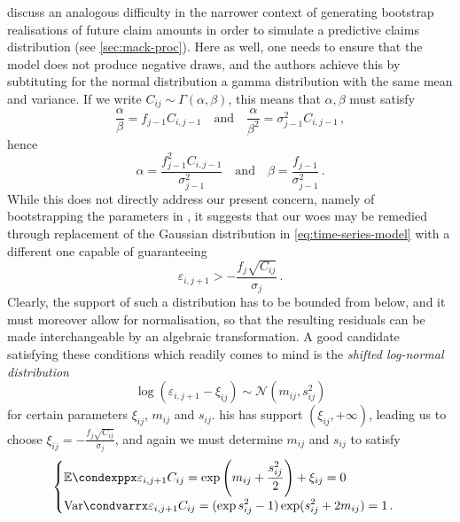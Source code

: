 \documentclass[a4paper]{book}
\begin{document}
\Textcite[238]{england:dist} discuss an analogous difficulty in the narrower context of generating bootstrap realisations of future claim amounts in order to simulate a predictive claims distribution (see \cref{sec:mack-proc}). Here as well, one needs to ensure that the model does not produce negative draws, and the authors achieve this by subtituting for the normal distribution a gamma distribution with the same mean and variance. If we write $C_{ij} \sim \Gamma(\alpha, \beta)$, this means that $\alpha, \beta$ must satisfy
\begin{equation}
  \frac{\alpha}{\beta} = f_{j-1} C_{i, j-1} \quad \text{and} \quad \frac{\alpha}{\beta^2} = \sigma^2_{j-1} C_{i, j-1} \,,
\end{equation}
hence
\begin{equation} \label{eq:gamma-sim}
  \alpha = \frac{f_{j-1}^2 C_{i, j-1}}{\sigma_{j-1}^2} \quad \text{and} \quad \beta = \frac{f_{j-1}}{\sigma_{j-1}^2} \,.
\end{equation}
While this does not directly address our present concern, namely of bootstrapping the parameters in , it suggests that our woes may be remedied through replacement of the Gaussian distribution in \cref{eq:time-series-model} with a different one capable of guaranteeing
\begin{equation} \label{eq:lower-limit-err}
  \varepsilon_{i, j + 1} > -\frac{f_j \sqrt{C_{ij}}}{\sigma_j} \,.
\end{equation}
Clearly, the support of such a distribution has to be bounded from below, and it must moreover allow for normalisation, so that the resulting residuals can be made interchangeable by an algebraic transformation. A good candidate satisfying these conditions which readily comes to mind is the \emph{shifted log-normal distribution}
\begin{equation}
  \log(\varepsilon_{i, j + 1} - \xi_{ij}) \sim \mathcal{N}(m_{ij}, s_{ij}^2)
\end{equation}
for certain parameters $\xi_{ij}$, $m_{ij}$ and $s_{ij}$. his has support $(\xi_{ij}, +\infty)$, leading us to choose $\xi_{ij} = -\frac{f_j \sqrt{C_{ij}}}{\sigma_j}$, and again we must determine $m_{ij}$ and $s_{ij}$ to satisfy
\begin{equation}
  \begin{cases}
    \displaystyle \condexpp{\varepsilon_{i, j + 1}}{C_{ij}} = \exp \left( m_{ij} + \frac{s_{ij}^2}{2} \right) + \xi_{ij} = 0 \\
    \displaystyle \condvarr{\varepsilon_{i, j + 1}}{C_{ij}} = (\exp{s_{ij}^2} - 1) \exp(s_{ij}^2 + 2 m_{ij}) = 1 \,.
  \end{cases}
\end{equation}
\end{document}
